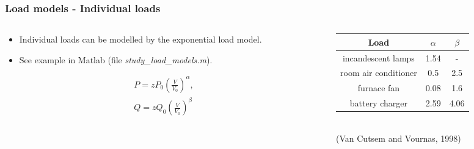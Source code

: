 \documentclass{beamer}
\begin{document}
\begin{frame}
  \frametitle{Load models - Individual loads}
  \begin{columns}
    \begin{column}{0.5\textwidth}
  \begin{itemize}
  \item Individual loads can be modelled by the exponential load model.
  \item See example in Matlab (file \emph{study\_load\_models.m}).
  \end{itemize}  
  \begin{align*}
    \label{eq:11}
P = zP_0 \left( \frac{V}{V_0} \right)^\alpha,\\
Q = z Q_0 \left( \frac{V}{V_0} \right)^\beta
  \end{align*}
    \end{column}
    \begin{column}{0.5\textwidth}
\begin{tabular}{ccc}
\toprule
Load & $\alpha$ & $\beta$ \\
\midrule
incandescent lamps & 1.54 & - \\
room air conditioner & 0.5 & 2.5 \\
furnace fan & 0.08 & 1.6 \\
battery charger & 2.59 & 4.06 \\
\bottomrule
\end{tabular}\\
(Van Cutsem and Vournas, 1998)\\      
    \end{column}
  \end{columns}

\end{frame}
\end{document}
